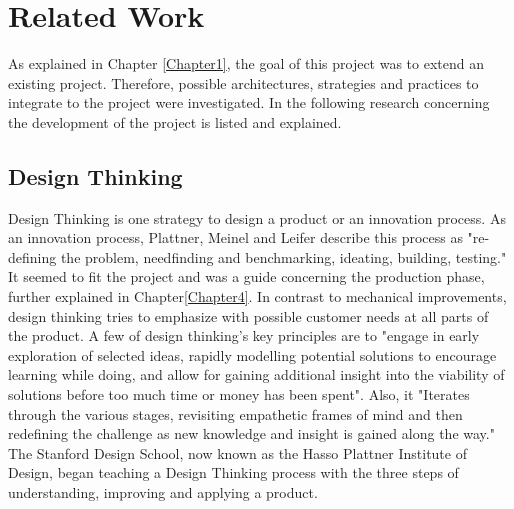 
\chapter{Related Work} %

\label{Chapter2} %
As explained in Chapter \ref{Chapter1}, the goal of this project was to extend an existing project.
Therefore, possible architectures, strategies and practices to integrate to the project were investigated.
In the following research concerning the development of the project is listed and explained.

\section{Design Thinking}
Design Thinking is one strategy to design a product or an innovation process.
As an innovation process, Plattner, Meinel and Leifer describe this process as 
"re-defining the problem, needfinding and benchmarking, ideating, building, testing." \parencite{designThinkingBook}
It seemed to fit the project and was a guide concerning the production phase, further explained in Chapter\ref{Chapter4}.
In contrast to mechanical improvements, design thinking tries to emphasize with possible customer needs at all parts of the product.
A few of design thinking's key principles are to 
"engage in early exploration of selected ideas, rapidly modelling potential solutions to encourage learning 
while doing, and allow for gaining additional insight into the viability of 
solutions before too much time or money has been spent". Also, it 
"Iterates through the various stages, revisiting empathetic frames of mind and then redefining the challenge as new knowledge and insight is gained along the way." 
\parencite{designThinking}
The Stanford Design School, now known as the Hasso Plattner Institute of Design, began teaching a Design Thinking process 
with the three steps of understanding, improving and applying a product. 


